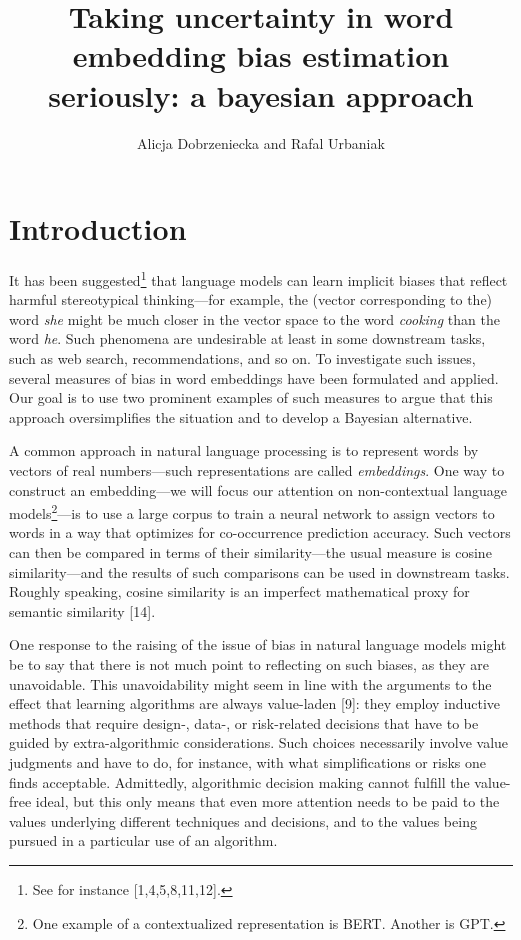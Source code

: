 \documentclass[
  12pt,
  dvipsnames,enabledeprecatedfontcommands]{scrartcl}
\title{Taking uncertainty in word embedding bias estimation seriously: a
bayesian approach}
\author{Alicja Dobrzeniecka and Rafal Urbaniak}
\date{}
\begin{document}
\maketitle

\hypertarget{introduction}{%
\section{Introduction}\label{introduction}}

It has been suggested\footnote{See for instance {[}1,4,5,8,11,12{]}.}
that language models can learn implicit biases that reflect harmful
stereotypical thinking---for example, the (vector corresponding to the)
word \textit{she} might be much closer in the vector space to the word
\textit{cooking} than the word \textit{he}. Such phenomena are
undesirable at least in some downstream tasks, such as web search,
recommendations, and so on. To investigate such issues, several measures
of bias in word embeddings have been formulated and applied. Our goal is
to use two prominent examples of such measures to argue that this
approach oversimplifies the situation and to develop a Bayesian
alternative.

A common approach in natural language processing is to represent words
by vectors of real numbers---such representations are called
\emph{embeddings}. One way to construct an embedding---we will focus our
attention on non-contextual language models\footnote{One example of a
  contextualized representation is BERT. Another is GPT.}---is to use a
large corpus to train a neural network to assign vectors to words in a
way that optimizes for co-occurrence prediction accuracy. Such vectors
can then be compared in terms of their similarity---the usual measure is
cosine similarity---and the results of such comparisons can be used in
downstream tasks. Roughly speaking, cosine similarity is an imperfect
mathematical proxy for semantic similarity {[}14{]}.

One response to the raising of the issue of bias in natural language
models might be to say that there is not much point to reflecting on
such biases, as they are unavoidable. This unavoidability might seem in
line with the arguments to the effect that learning algorithms are
always value-laden {[}9{]}: they employ inductive methods that require
design-, data-, or risk-related decisions that have to be guided by
extra-algorithmic considerations. Such choices necessarily involve value
judgments and have to do, for instance, with what simplifications or
risks one finds acceptable. Admittedly, algorithmic decision making
cannot fulfill the value-free ideal, but this only means that even more
attention needs to be paid to the values underlying different techniques
and decisions, and to the values being pursued in a particular use of an
algorithm.
\end{document}
